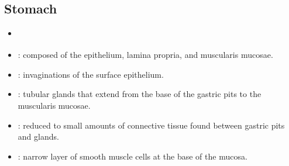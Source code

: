 \begin{itemize}
  \newpage

  \subsection{Stomach}\label{Stomach}
  \begin{multicols}{2}
  \begin{itemize}
    \item {}
    
    \begin{center}
    \end{center}
    
    \item {}: composed of the epithelium, lamina propria, and muscularis mucosae. 
    
    \begin{center}
    \end{center}

    \item {}: invaginations of the surface epithelium.
    
    \begin{center}
    \end{center}
    
    \item {}: tubular glands that extend from the base of the gastric pits to the muscularis mucosae.
    
    \begin{center}
    \end{center}

    \item {}: reduced to small amounts of connective tissue found between gastric pits and glands.
    
    \begin{center}
    \end{center}
    

    \item {}: narrow layer of smooth muscle cells at the base of the mucosa.
    
    \begin{center}
    \end{center}
    

\end{itemize}
\end{multicols}
\end{itemize}
